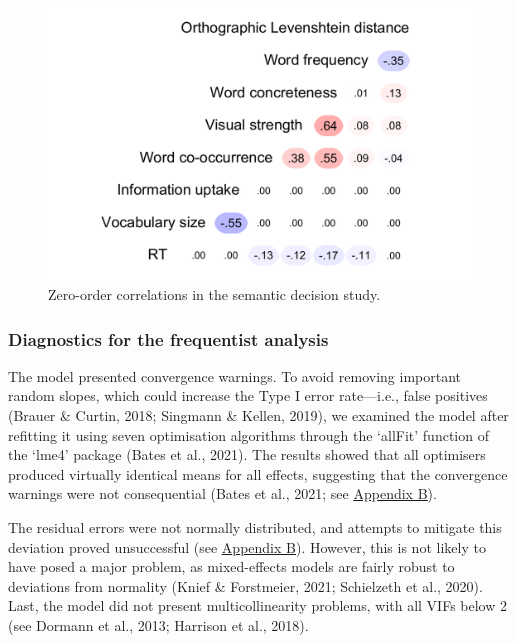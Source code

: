 \documentclass[
  12pt,
  man,floatsintext]{apa7}
\begin{document}
\begin{figure}

{\centering \includegraphics[width=0.61\linewidth]{manuscript_files/figure-latex/semanticdecision-correlations-1} 

}

\caption{Zero-order correlations in the semantic decision study.}\label{fig:semanticdecision-correlations}
\end{figure}

\hypertarget{diagnostics-for-the-frequentist-analysis-2}{%
\subsubsection{Diagnostics for the frequentist analysis}\label{diagnostics-for-the-frequentist-analysis-2}}

The model presented convergence warnings. To avoid removing important random slopes, which could increase the Type I error rate---i.e., false positives (Brauer \& Curtin, 2018; Singmann \& Kellen, 2019), we examined the model after refitting it using seven optimisation algorithms through the `allFit' function of the `lme4' package (Bates et al., 2021). The results showed that all optimisers produced virtually identical means for all effects, suggesting that the convergence warnings were not consequential (Bates et al., 2021; see \protect\hyperlink{appendix-B-frequentist-analysis-diagnostics}{\underline{Appendix B}}).

The residual errors were not normally distributed, and attempts to mitigate this deviation proved unsuccessful (see \protect\hyperlink{appendix-B-frequentist-analysis-diagnostics}{\underline{Appendix B}}). However, this is not likely to have posed a major problem, as mixed-effects models are fairly robust to deviations from normality (Knief \& Forstmeier, 2021; Schielzeth et al., 2020). Last, the model did not present multicollinearity problems, with all VIFs below 2 (see Dormann et al., 2013; Harrison et al., 2018).
\end{document}
